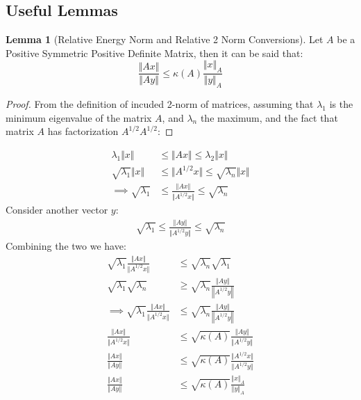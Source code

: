 \documentclass[]{article}
\theoremstyle{definition}
\newtheorem{lemma}{Lemma}[subsection]    %
\begin{document}
    \subsection{Useful Lemmas}
        \begin{lemma}[Relative Energy Norm and Relative 2 Norm Conversions]\label{lemma:Relative_Energy_Norm_and_Relative_2_Norm_Conversions}
            Let $A$ be a Positive Symmetric Positive Definite Matrix, then it can be said that: 
            $$
            \frac{\Vert A x\Vert}{\Vert Ay \Vert} \le \kappa(A)\frac{\Vert 
            x\Vert_A}{\Vert y \Vert_A}
            $$
        \end{lemma}
        \begin{proof}
            From the definition of incuded 2-norm of matrices, assuming that $\lambda_1$ is the minimum eigenvalue of the matrix $A$, and $\lambda_n$ the maximum, and the fact that matrix $A$ has factorization $A^{1/2}A^{1/2}$: 
        \end{proof}
        \begin{align}
            \lambda_1 \Vert x \Vert 
            &\le \Vert Ax\Vert 
            \le \lambda_2 \Vert x\Vert
            \\
            \sqrt{\lambda_1} \Vert x\Vert 
            & \le \Vert A^{1/2}x\Vert \le \sqrt{\lambda_n}\Vert x \Vert
            \\
            \implies
            \sqrt{\lambda_1} & \le \frac{\Vert Ax\Vert}{\Vert A^{1/2}x \Vert} 
            \le \sqrt{\lambda_n}
        \end{align}
        Consider another vector $y$: 
        \begin{align}
            \sqrt{\lambda_1} \le \frac{\Vert Ay\Vert}{\Vert A^{1/2}y \Vert} \le \sqrt{\lambda_n}
        \end{align}
        Combining the two we have: 
        \begin{align}
            \sqrt{\lambda_1}\frac{\Vert Ax\Vert}{\Vert A^{1/2}x \Vert} 
            & \le \sqrt{\lambda_n}\sqrt{\lambda_1}
            \\
            \sqrt{\lambda_1}\sqrt{\lambda_n}& \ge \sqrt{\lambda_n} \frac{\Vert Ay\Vert}{\left\Vert
                A^{1/2}y
            \right\Vert}
            \\
            \implies 
            \sqrt{\lambda_1}\frac{\Vert Ax\Vert}{\Vert A^{1/2}x \Vert} & \le 
            \sqrt{\lambda_n} \frac{\Vert Ay\Vert}{\left\Vert
                A^{1/2}y
            \right\Vert}
            \\
            \frac{\Vert Ax\Vert}{\Vert A^{1/2}x\Vert} &\le 
            \sqrt{\kappa(A)} 
            \frac{\Vert Ay\Vert}{\Vert A^{1/2}y\Vert}
            \\
            \frac{\Vert Ax\Vert}{\Vert Ay\Vert} &\le 
            \sqrt{\kappa(A)} 
            \frac{\Vert A^{1/2}x\Vert}{\Vert A^{1/2}y\Vert}
            \\
            \frac{\Vert Ax\Vert}{\Vert Ay\Vert} &\le 
            \sqrt{\kappa(A)} 
            \frac{\Vert x\Vert_A}{\Vert y\Vert_A}
        \end{align}
\end{document}
